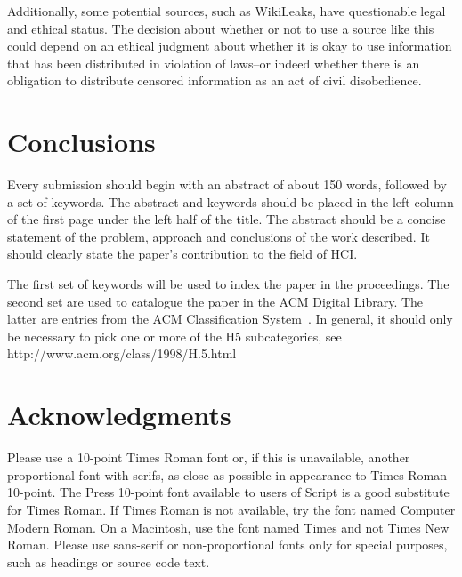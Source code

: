 \documentclass{chi2009}
\begin{document}
Additionally, some potential sources, such as WikiLeaks, have questionable legal and ethical status.
The decision about whether or not to use a source like this could depend on an ethical judgment about whether it is okay to use information that has been distributed in violation of laws--or indeed whether there is an obligation to distribute censored information as an act of civil disobedience.

\section{Conclusions}

Every submission should begin with an abstract of about 150 words,
followed by a set of keywords. The abstract and keywords should be
placed in the left column of the first page under the left half of the
title. The abstract should be a concise statement of the problem,
approach and conclusions of the work described.  It should clearly
state the paper's contribution to the field of HCI.

The first set of keywords will be used to index the paper in the
proceedings. The second set are used to catalogue the paper in the ACM
Digital Library. The latter are entries from the ACM Classification
System~\cite{acm_categories}.  In general, it should only be necessary
to pick one or more of the H5 subcategories, see
http://www.acm.org/class/1998/H.5.html

\section{Acknowledgments}

Please use a 10-point Times Roman font or, if this is unavailable,
another proportional font with serifs, as close as possible in
appearance to Times Roman 10-point. The Press 10-point font available
to users of Script is a good substitute for Times Roman. If Times
Roman is not available, try the font named Computer Modern Roman. On a
Macintosh, use the font named Times and not Times New Roman. Please
use sans-serif or non-proportional fonts only for special purposes,
such as headings or source code text.



\end{document}
